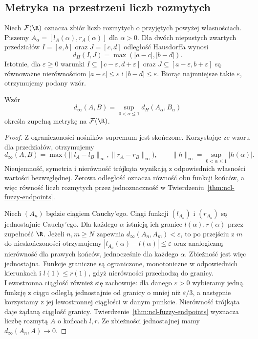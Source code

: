 \subsection{Metryka na przestrzeni liczb rozmytych}
Niech $\mathcal F(\R)$ oznacza zbiór liczb rozmytych
o przyjętych powyżej własnościach. Piszemy
$A_\alpha=[l_A(\alpha),r_A(\alpha)]$ dla $\alpha>0$.
Dla dwóch niepustych zwartych przedziałów
$I=[a,b]$ oraz $J=[c,d]$ odległość Hausdorffa wynosi
\[
 d_H(I,J)=\max(|a-c|,|b-d|).
\]
Istotnie, dla $\varepsilon\geq0$ warunki
$I\subseteq[c-\varepsilon,d+\varepsilon]$ oraz
$J\subseteq[a-\varepsilon,b+\varepsilon]$
są równoważne nierównościom
$|a-c|\leq\varepsilon$ i $|b-d|\leq\varepsilon$.
Biorąc najmniejsze takie $\varepsilon$,
otrzymujemy podany wzór.

\begin{twierdzenie}
\label{thm:ncl-fuzzy-metric-complete}
Wzór
\[
 d_\infty(A,B)=\sup_{0<\alpha\leq1}d_H(A_\alpha,B_\alpha)
\]
określa zupełną metrykę na $\mathcal F(\R)$.
\end{twierdzenie}
\begin{proof}
Z ograniczoności nośników supremum jest skończone.
Korzystając ze wzoru dla przedziałów, otrzymujemy
\[
 d_\infty(A,B)=
 \max\bigl(\|l_A-l_B\|_\infty,\|r_A-r_B\|_\infty\bigr),
 \qquad
 \|h\|_\infty=\sup_{0<\alpha\leq1}|h(\alpha)|.
\]
Nieujemność, symetria i nierówność trójkąta
wynikają z odpowiednich własności wartości bezwzględnej.
Zerowa odległość oznacza równość obu funkcji końców,
a więc równość liczb rozmytych przez jednoznaczność
w Twierdzeniu~\ref{thm:ncl-fuzzy-endpoints}.

Niech $(A_n)$ będzie ciągiem Cauchy'ego.
Ciągi funkcji $(l_{A_n})$ i $(r_{A_n})$ są jednostajnie
Cauchy'ego. Dla każdego $\alpha$ istnieją ich granice
$l(\alpha),r(\alpha)$ przez zupełność $\R$.
Jeżeli $n,m\geq N$ zapewnia
$d_\infty(A_n,A_m)<\varepsilon$, to po przejściu
z $m$ do nieskończoności otrzymujemy
$|l_{A_n}(\alpha)-l(\alpha)|\leq\varepsilon$
oraz analogiczną nierówność dla prawych końców,
jednocześnie dla każdego $\alpha$.
Zbieżność jest więc jednostajna.
Funkcje graniczne są ograniczone, monotoniczne
w odpowiednich kierunkach i $l(1)\leq r(1)$,
gdyż nierówności przechodzą do granicy.
Lewostronna ciągłość również się zachowuje:
dla danego $\varepsilon>0$ wybieramy jedną funkcję
z ciągu odległą jednostajnie od granicy o mniej
niż $\varepsilon/3$, a następnie korzystamy z jej
lewostronnej ciągłości w danym punkcie. Nierówność
trójkąta daje żądaną ciągłość granicy.
Twierdzenie~\ref{thm:ncl-fuzzy-endpoints}
wyznacza liczbę rozmytą $A$ o końcach $l,r$.
Ze zbieżności jednostajnej mamy $d_\infty(A_n,A)\to0$.
\end{proof}

